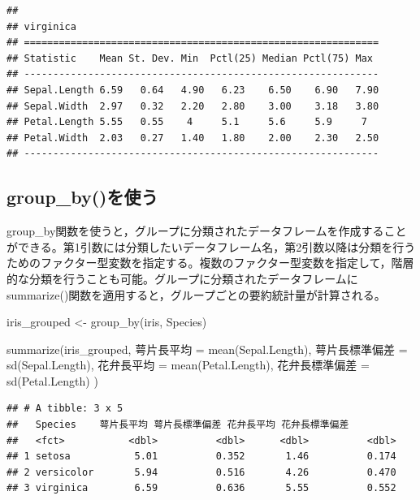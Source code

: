 \documentclass[
]{book}
\newenvironment{Shaded}{\begin{snugshade}}{\end{snugshade}}
\newcommand{\FunctionTok}[1]{\textcolor[rgb]{0.00,0.00,0.00}{#1}}
\newcommand{\NormalTok}[1]{#1}
\newcommand{\OtherTok}[1]{\textcolor[rgb]{0.56,0.35,0.01}{#1}}
\begin{document}
\begin{verbatim}
## 
## virginica
## =============================================================
## Statistic    Mean St. Dev. Min  Pctl(25) Median Pctl(75) Max 
## -------------------------------------------------------------
## Sepal.Length 6.59   0.64   4.90   6.23    6.50    6.90   7.90
## Sepal.Width  2.97   0.32   2.20   2.80    3.00    3.18   3.80
## Petal.Length 5.55   0.55    4     5.1     5.6     5.9     7  
## Petal.Width  2.03   0.27   1.40   1.80    2.00    2.30   2.50
## -------------------------------------------------------------
\end{verbatim}

\hypertarget{group_byux3092ux4f7fux3046}{%
\subsection{group\_by()を使う}\label{group_byux3092ux4f7fux3046}}

group\_by関数を使うと，グループに分類されたデータフレームを作成することができる。第1引数には分類したいデータフレーム名，第2引数以降は分類を行うためのファクター型変数を指定する。複数のファクター型変数を指定して，階層的な分類を行うことも可能。グループに分類されたデータフレームにsummarize()関数を適用すると，グループごとの要約統計量が計算される。

\begin{Shaded}
\begin{Highlighting}[]
\NormalTok{iris\_grouped }\OtherTok{\textless{}{-}} \FunctionTok{group\_by}\NormalTok{(iris, Species)}

\FunctionTok{summarize}\NormalTok{(iris\_grouped, }
\NormalTok{          萼片長平均     }\OtherTok{=} \FunctionTok{mean}\NormalTok{(Sepal.Length),}
\NormalTok{          萼片長標準偏差 }\OtherTok{=} \FunctionTok{sd}\NormalTok{(Sepal.Length),}
\NormalTok{          花弁長平均     }\OtherTok{=} \FunctionTok{mean}\NormalTok{(Petal.Length),}
\NormalTok{          花弁長標準偏差 }\OtherTok{=} \FunctionTok{sd}\NormalTok{(Petal.Length)}
\NormalTok{          )}
\end{Highlighting}
\end{Shaded}

\begin{verbatim}
## # A tibble: 3 x 5
##   Species    萼片長平均 萼片長標準偏差 花弁長平均 花弁長標準偏差
##   <fct>           <dbl>          <dbl>      <dbl>          <dbl>
## 1 setosa           5.01          0.352       1.46          0.174
## 2 versicolor       5.94          0.516       4.26          0.470
## 3 virginica        6.59          0.636       5.55          0.552
\end{verbatim}
\end{document}
